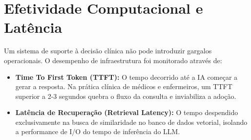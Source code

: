 \documentclass[12pt]{article}
\begin{document}
\section{Efetividade Computacional e Latência}
Um sistema de suporte à decisão clínica não pode introduzir gargalos operacionais. O desempenho de infraestrutura foi monitorado através de:
\begin{itemize}
\item \textbf{Time To First Token (TTFT):} O tempo decorrido até a IA começar a gerar a resposta. Na prática clínica de médicos e enfermeiros, um TTFT superior a 2-3 segundos quebra o fluxo da consulta e inviabiliza a adoção.
\item \textbf{Latência de Recuperação (Retrieval Latency):} O tempo despendido exclusivamente na busca de similaridade no banco de dados vetorial, isolando a performance de I/O do tempo de inferência do LLM.
\end{itemize}


\end{document}
